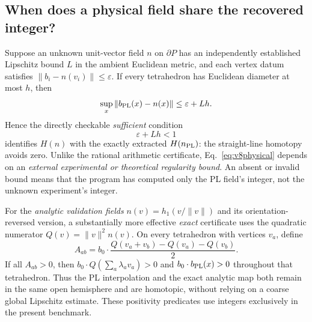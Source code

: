 \documentclass[aps,prd,onecolumn,notitlepage,11pt,superscriptaddress,longbibliography]{revtex4-2}
\begin{document}
\subsection{When does a physical field share the recovered integer?}
Suppose an unknown unit-vector field $n$ on $\partial P$ has an independently established Lipschitz bound $L$ in the ambient Euclidean metric, and each vertex datum satisfies $\|b_i-n(v_i)\|\le\varepsilon$. If every tetrahedron has Euclidean diameter at most $h$, then
\begin{equation}
\sup_x\|b_{\rm PL}(x)-n(x)\|\le\varepsilon+Lh.
\end{equation}
Hence the directly checkable \emph{sufficient} condition
\begin{equation}
\boxed{\varepsilon+Lh<1}\label{eq:v8physical}
\end{equation}
identifies $H(n)$ with the exactly extracted $H(n_{\rm PL})$: the straight-line homotopy avoids zero. Unlike the rational arithmetic certificate, Eq.~\eqref{eq:v8physical} depends on an \emph{external experimental or theoretical regularity bound}. An absent or invalid bound means that the program has computed only the PL field's integer, not the unknown experiment's integer.

For the \emph{analytic validation fields} $n(v)=h_1(v/\|v\|)$ and its orientation-reversed version, a substantially more effective \emph{exact} certificate uses the quadratic numerator $Q(v)=\|v\|^2n(v)$. On every tetrahedron with vertices $v_a$, define
\begin{equation}
  A_{ab}=b_0\cdot\frac{Q(v_a+v_b)-Q(v_a)-Q(v_b)}{2}.
\end{equation}
If all $A_{ab}>0$, then $b_0\cdot Q(\sum_a\lambda_av_a)>0$ and $b_0\cdot b_{\rm PL}(x)>0$ throughout that tetrahedron. Thus the PL interpolation and the exact analytic map both remain in the same open hemisphere and are homotopic, without relying on a coarse global Lipschitz estimate. These positivity predicates use integers exclusively in the present benchmark.
\end{document}
